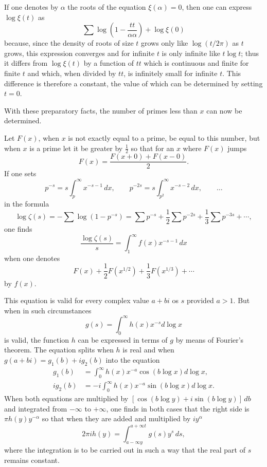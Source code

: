 If one denotes by $\alpha$ the roots of the equation $\xi(\alpha) = 0$,
then one can express $\log\xi(t)$ as
%
\[
\sum\log\left(1 - \frac{tt}{\alpha\alpha}\right) + \log\xi(0)
\]
%
because, since the density of roots of size $t$ grows only like $\log(t/2\pi)$
as $t$ grows, this expression converges and for infinite $t$ is only infinite
like $t\log t$; thus it differs from $\log\xi(t)$ by a function of $tt$ which
is continuous and finite for finite $t$ and which, when divided by $tt$, is
infinitely small for infinite $t$. This difference is therefore a constant, 
the value of which can be determined by setting $t=0$.

With these preparatory facts, the number of primes less than $x$ can now be
determined.

Let $F(x)$, when $x$ is not exactly equal to a prime, be equal to this number,
but when $x$ is a prime let it be greater by $\frac{1}{2}$ so that for an $x$
where $F(x)$ jumps
%
\[
F(x) = \frac{F(x+0) + F(x-0)}{2}.
\]
%
If one sets
%
\[
p^{-s} = s\int_p^{\infty} x^{-s-1} \, dx, 
\qquad
p^{-2s} = s\int_{p^2}^{\infty} x^{-s-2} \, dx,
\qquad
\dots
\]
%
in the formula
%
\[
\log\zeta(s) = -\sum\log(1 - p^{-s}) 
             = \sum p^{-s} + \frac{1}{2}\sum p^{-2s} + \frac{1}{3}\sum p^{-3s}
             + \cdots,
\]
%
one finds
%
\[
\frac{\log\zeta(s)}{s} = \int_1^{\infty} f(x)x^{-s-1} \, dx
\]
%
when one denotes
%
\[
F(x) + \frac{1}{2}F(x^{1/2}) + \frac{1}{3}F(x^{1/3}) + \cdots
\]
%
by $f(x)$.

This equation is valid for every complex value $a+bi$ os $s$ provided $a>1$.
But when in such circumstances
%
\[
g(s) = \int_0^{\infty} h(x)x^{-s} d\log x
\]
%
is valid, the function $h$ can be expressed in terms of $g$ by means of 
Fourier's theorem. The equation splits when $h$ is real and when 
$g(a+bi) = g_1(b) + ig_2(b)$ into the equation
%
\begin{align*}
    g_1(b) &= \int_0^{\infty} h(x)x^{-a}\cos(b\log x) d\log x, \\
    ig_2(b) &= -i\int_0^{\infty} h(x)x^{-a}\sin(b\log x) d\log x.
\end{align*}
%
When both equations are multiplied by $[\cos(b\log y) + i\sin(b\log y)]\, db$
and integrated from $-\infty$ to $+\infty$, one finds in both cases that the
right side is $\pi h(y)y^{-\alpha}$ so that when they are added and multiplied
by $iy^{\alpha}$
%
\[
2\pi i h(y) = \int_{a - \infty y}^{a + \infty t} g(s) y^s \, ds,
\]
%
where the integration is to be carried out in such a way that the real part
of $s$ remains constant.

